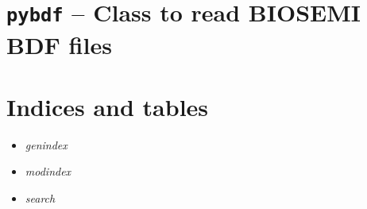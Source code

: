 \documentclass[letterpaper,10pt,english]{sphinxmanual}
\begin{document}
\chapter{\texttt{pybdf} -- Class to read BIOSEMI BDF files}
\label{intro:module-label}\label{intro:pybdf-class-to-read-biosemi-bdf-files}

\chapter{Indices and tables}
\label{index:indices-and-tables}\begin{itemize}
\item {} 
\emph{genindex}

\item {} 
\emph{modindex}

\item {} 
\emph{search}

\end{itemize}



\renewcommand{\indexname}{Index}
\printindex
\end{document}
